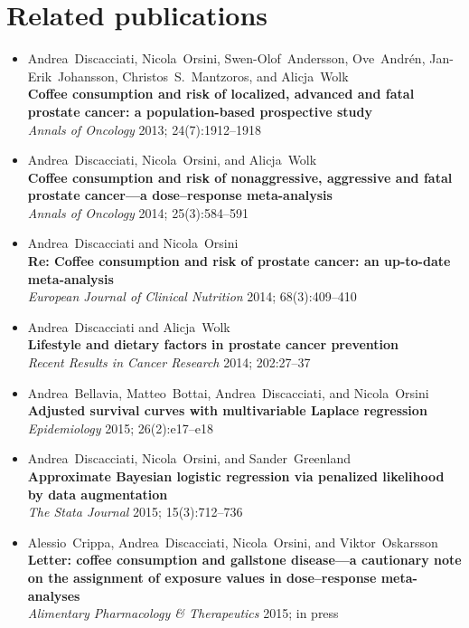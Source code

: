 \chapter*{Related publications}
\begin{itemize}
\item Andrea~Discacciati, Nicola~Orsini, Swen-Olof~Andersson, Ove~Andrén, Jan-Erik~Johansson, Christos~S.~Mantzoros, and Alicja~Wolk \\ \textbf{Coffee consumption and risk of localized, advanced and fatal prostate cancer: a population-based prospective study} \\ \textit{Annals of Oncology} 2013; 24(7):1912--1918
\item Andrea~Discacciati, Nicola~Orsini, and Alicja~Wolk \\ \textbf{Coffee consumption and risk of nonaggressive, aggressive and fatal prostate cancer---a dose--response meta-analysis} \\ \textit{Annals of Oncology} 2014; 25(3):584--591
\item Andrea~Discacciati and Nicola~Orsini \\ \textbf{Re: Coffee consumption and risk of prostate cancer: an up-to-date meta-analysis} \\ \textit{European Journal of Clinical Nutrition} 2014; 68(3):409--410
\item Andrea~Discacciati and Alicja~Wolk \\ \textbf{Lifestyle and dietary factors in prostate cancer prevention} \\ \textit{Recent Results in Cancer Research} 2014; 202:27--37
\item Andrea~Bellavia, Matteo~Bottai, Andrea~Discacciati, and Nicola~Orsini \\ \textbf{Adjusted survival curves with multivariable Laplace regression} \\ \textit{Epidemiology} 2015; 26(2):e17--e18
\item Andrea~Discacciati, Nicola~Orsini, and Sander~Greenland \\ \textbf{Approximate Bayesian logistic regression via penalized likelihood by data augmentation} \\ \textit{The Stata Journal} 2015; 15(3):712--736 
\item Alessio~Crippa, Andrea~Discacciati, Nicola~Orsini, and Viktor~Oskarsson \\ \textbf{Letter: coffee consumption and gallstone disease---a cautionary note on the assignment of exposure values in dose--response meta-analyses} \\ \textit{Alimentary Pharmacology \& Therapeutics} 2015; in press
\end{itemize}